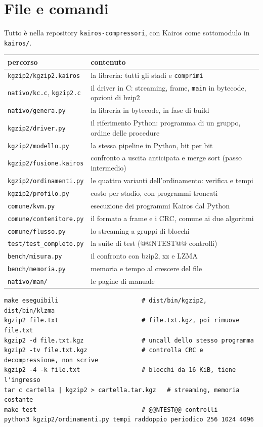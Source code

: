 \documentclass[11pt,a4paper]{article}
\newcommand{\kw}[1]{\texttt{#1}}
\begin{document}
\appendix
\section{File e comandi}

Tutto è nella repository \kw{kairos-compressori}, con Kairos come sottomodulo in \kw{kairos/}.

\begin{center}\small
\begin{tabular}{@{}ll@{}}
\toprule
percorso & contenuto \\
\midrule
\kw{kgzip2/kgzip2.kairos} & la libreria: tutti gli stadi e \kw{comprimi} \\
\kw{nativo/kc.c}, \kw{kgzip2.c} & il driver in C: streaming, frame, \kw{main} in bytecode, opzioni di bzip2 \\
\kw{nativo/genera.py} & la libreria in bytecode, in fase di build \\
\kw{kgzip2/driver.py} & il riferimento Python: programma di un gruppo, ordine delle procedure \\
\kw{kgzip2/modello.py} & la stessa pipeline in Python, bit per bit \\
\kw{kgzip2/fusione.kairos} & confronto a uscita anticipata e merge sort (passo intermedio) \\
\kw{kgzip2/ordinamenti.py} & le quattro varianti dell'ordinamento: verifica e tempi \\
\kw{kgzip2/profilo.py} & costo per stadio, con programmi troncati \\
\kw{comune/kvm.py} & esecuzione dei programmi Kairos dal Python \\
\kw{comune/contenitore.py} & il formato a frame e i CRC, comune ai due algoritmi \\
\kw{comune/flusso.py} & lo streaming a gruppi di blocchi \\
\kw{test/test\_completo.py} & la suite di test (@@NTEST@@ controlli) \\
\kw{bench/misura.py} & il confronto con bzip2, xz e LZMA \\
\kw{bench/memoria.py} & memoria e tempo al crescere del file \\
\kw{nativo/man/} & le pagine di manuale \\
\bottomrule
\end{tabular}
\end{center}

\begin{lstlisting}[language={}, basicstyle=\ttfamily\footnotesize]
make eseguibili                       # dist/bin/kgzip2, dist/bin/klzma
kgzip2 file.txt                       # file.txt.kgz, poi rimuove file.txt
kgzip2 -d file.txt.kgz                # uncall dello stesso programma
kgzip2 -tv file.txt.kgz               # controlla CRC e decompressione, non scrive
kgzip2 -4 -k file.txt                 # blocchi da 16 KiB, tiene l'ingresso
tar c cartella | kgzip2 > cartella.tar.kgz   # streaming, memoria costante
make test                             # @@NTEST@@ controlli
python3 kgzip2/ordinamenti.py tempi raddoppio periodico 256 1024 4096
\end{lstlisting}
\end{document}
